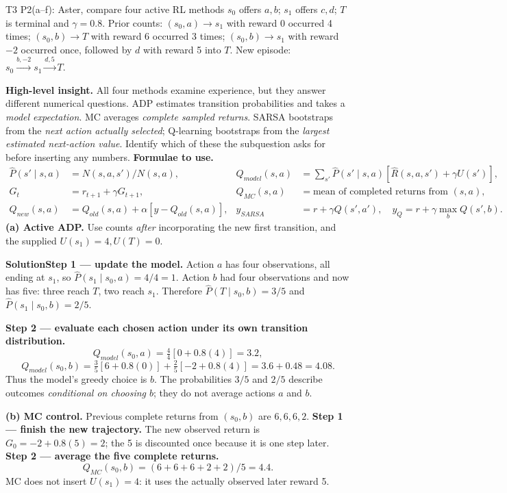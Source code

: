 \documentclass[10pt,a4paper]{article}
\newcommand{\ans}{\par\smallskip\textbf{\color{good}Solution\quad}}
\begin{document}
\begin{question}{T3 P2(a--f): Aster, compare four active RL methods}\label{q:t3p2}
$s_0$ offers $a,b$; $s_1$ offers $c,d$; $T$ is terminal and $\gamma=0.8$.
Prior counts: $(s_0,a)\to s_1$ with reward 0 occurred 4 times; $(s_0,b)\to T$ with reward 6 occurred 3 times; $(s_0,b)\to s_1$ with reward $-2$ occurred once, followed by $d$ with reward 5 into $T$.
New episode: $s_0\xrightarrow{b,-2}s_1\xrightarrow{d,5}T$.

\textbf{High-level insight.} All four methods examine experience, but they answer different numerical questions. ADP estimates transition probabilities and takes a \emph{model expectation}. MC averages \emph{complete sampled returns}. SARSA bootstraps from the \emph{next action actually selected}; Q-learning bootstraps from the \emph{largest estimated next-action value}. Identify which of these the subquestion asks for before inserting any numbers.
\textbf{Formulae to use.}
\[
\begin{aligned}
\hat P(s'\mid s,a)&=N(s,a,s')/N(s,a),&
Q_{model}(s,a)&=\sum_{s'}\hat P(s'\mid s,a)[\hat R(s,a,s')+\gamma U(s')],\\
G_t&=r_{t+1}+\gamma G_{t+1},&
Q_{MC}(s,a)&=\text{mean of completed returns from }(s,a),\\
Q_{new}(s,a)&=Q_{old}(s,a)+\alpha[y-Q_{old}(s,a)],&
y_{SARSA}&=r+\gamma Q(s',a'),\quad y_Q=r+\gamma\max_bQ(s',b).
\end{aligned}
\]
\textbf{(a) Active ADP.} Use counts \emph{after} incorporating the new first transition, and the supplied $U(s_1)=4,U(T)=0$.
\ans \textbf{Step 1 --- update the model.} Action $a$ has four observations, all ending at $s_1$, so $\hat P(s_1\mid s_0,a)=4/4=1$. Action $b$ had four observations and now has five: three reach $T$, two reach $s_1$. Therefore $\hat P(T\mid s_0,b)=3/5$ and $\hat P(s_1\mid s_0,b)=2/5$.

\textbf{Step 2 --- evaluate each chosen action under its own transition distribution.}
\[
Q_{model}(s_0,a)=\tfrac44[0+0.8(4)]=3.2,
\]
\[
Q_{model}(s_0,b)=\tfrac35[6+0.8(0)]+\tfrac25[-2+0.8(4)]
=3.6+0.48=\boxed{4.08}.
\]
Thus the model's greedy choice is $b$. The probabilities $3/5$ and $2/5$ describe outcomes \emph{conditional on choosing $b$}; they do not average actions $a$ and $b$.

\textbf{(b) MC control.} Previous complete returns from $(s_0,b)$ are $6,6,6,2$.
\textbf{Step 1 --- finish the new trajectory.} The new observed return is $G_0=-2+0.8(5)=2$; the 5 is discounted once because it is one step later.
\textbf{Step 2 --- average the five complete returns.}
\[
\boxed{Q_{MC}(s_0,b)=(6+6+6+2+2)/5=4.4.}
\]
MC does not insert $U(s_1)=4$: it uses the actually observed later reward 5.


\end{question}
\end{document}
